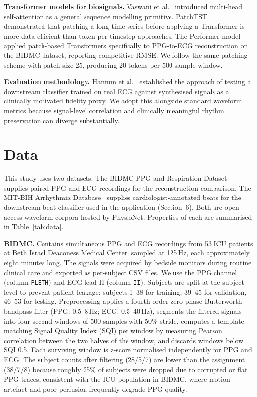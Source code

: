 \documentclass[11pt,a4paper]{article}
\begin{document}
\textbf{Transformer models for biosignals.} Vaswani et al.~\cite{vaswani2017attention} introduced multi-head self-attention as a general sequence modelling primitive. PatchTST~\cite{nie2023patchtst} demonstrated that patching a long time series before applying a Transformer is more data-efficient than token-per-timestep approaches. The Performer model~\cite{lan2023performer} applied patch-based Transformers specifically to PPG-to-ECG reconstruction on the BIDMC dataset, reporting competitive RMSE. We follow the same patching scheme with patch size 25, producing 20 tokens per 500-sample window.

\textbf{Evaluation methodology.} Hannun et al.~\cite{hannun2019cardiologist} established the approach of testing a downstream classifier trained on real ECG against synthesised signals as a clinically motivated fidelity proxy. We adopt this alongside standard waveform metrics because signal-level correlation and clinically meaningful rhythm preservation can diverge substantially.

\section{Data}

This study uses two datasets. The BIDMC PPG and Respiration Dataset~\cite{goldberger2000physionet,pimentel2017bidmc} supplies paired PPG and ECG recordings for the reconstruction comparison. The MIT-BIH Arrhythmia Database~\cite{moody2001mitbih} supplies cardiologist-annotated beats for the downstream beat classifier used in the application (Section~6). Both are open-access waveform corpora hosted by PhysioNet. Properties of each are summarised in Table~\ref{tab:data}.

\textbf{BIDMC.} Contains simultaneous PPG and ECG recordings from 53 ICU patients at Beth Israel Deaconess Medical Center, sampled at 125\,Hz, each approximately eight minutes long. The signals were acquired by bedside monitors during routine clinical care and exported as per-subject CSV files. We use the PPG channel (column \texttt{PLETH}) and ECG lead II (column \texttt{II}). Subjects are split at the subject level to prevent patient leakage: subjects 1--38 for training, 39--45 for validation, 46--53 for testing. Preprocessing applies a fourth-order zero-phase Butterworth bandpass filter (PPG: 0.5--8\,Hz; ECG: 0.5--40\,Hz), segments the filtered signals into four-second windows of 500 samples with 50\% stride, computes a template-matching Signal Quality Index (SQI) per window by measuring Pearson correlation between the two halves of the window, and discards windows below SQI 0.5. Each surviving window is z-score normalised independently for PPG and ECG. The subject counts after filtering (28/5/7) are lower than the assignment (38/7/8) because roughly 25\% of subjects were dropped due to corrupted or flat PPG traces, consistent with the ICU population in BIDMC, where motion artefact and poor perfusion frequently degrade PPG quality.
\end{document}
